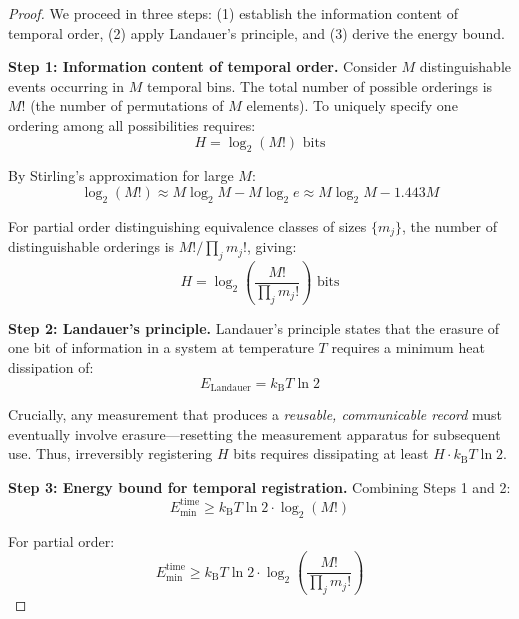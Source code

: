 \documentclass[12pt]{article}
\numberwithin{equation}{section}
\newcommand{\kB}{k_{\mathrm{B}}}
\begin{document}
\begin{proof}
We proceed in three steps: (1) establish the information content of temporal order, (2) apply Landauer's principle, and (3) derive the energy bound.

\textbf{Step 1: Information content of temporal order.}
Consider $M$ distinguishable events occurring in $M$ temporal bins. The total number of possible orderings is $M!$ (the number of permutations of $M$ elements). To uniquely specify one ordering among all possibilities requires:
\begin{equation}
H = \log_2(M!) \text{ bits}
\end{equation}

By Stirling's approximation for large $M$:
\begin{equation}
\log_2(M!) \approx M\log_2 M - M\log_2 e \approx M\log_2 M - 1.443M
\end{equation}

For partial order distinguishing equivalence classes of sizes $\{m_j\}$, the number of distinguishable orderings is $M!/\prod_j m_j!$, giving:
\begin{equation}
H = \log_2\left(\frac{M!}{\prod_j m_j!}\right) \text{ bits}
\end{equation}

\textbf{Step 2: Landauer's principle.}
Landauer's principle states that the erasure of one bit of information in a system at temperature $T$ requires a minimum heat dissipation of:
\begin{equation}
E_{\text{Landauer}} = \kB T \ln 2
\end{equation}

Crucially, any measurement that produces a \emph{reusable, communicable record} must eventually involve erasure---resetting the measurement apparatus for subsequent use. Thus, irreversibly registering $H$ bits requires dissipating at least $H \cdot \kB T \ln 2$.

\textbf{Step 3: Energy bound for temporal registration.}
Combining Steps 1 and 2:
\begin{equation}
E_{\min}^{\mathrm{time}} \ge \kB T\ln 2 \cdot \log_2(M!)
\end{equation}

For partial order:
\begin{equation}
E_{\min}^{\mathrm{time}} \ge \kB T\ln 2 \cdot \log_2\left(\frac{M!}{\prod_j m_j!}\right)
\end{equation}


\end{proof}
\end{document}
